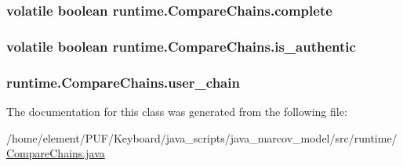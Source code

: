 \subsubsection[{\texorpdfstring{complete}{complete}}]{\setlength{\rightskip}{0pt plus 5cm}volatile boolean runtime.\+Compare\+Chains.\+complete\hspace{0.3cm}{\ttfamily [protected]}}\hypertarget{classruntime_1_1_compare_chains_a506b689f300e16b70789ea87eef80387}{}\label{classruntime_1_1_compare_chains_a506b689f300e16b70789ea87eef80387}
\subsubsection[{\texorpdfstring{is\+\_\+authentic}{is_authentic}}]{\setlength{\rightskip}{0pt plus 5cm}volatile boolean runtime.\+Compare\+Chains.\+is\+\_\+authentic\hspace{0.3cm}{\ttfamily [protected]}}\hypertarget{classruntime_1_1_compare_chains_a55fec8bf930fcd0c7ab835f14b85ac6d}{}\label{classruntime_1_1_compare_chains_a55fec8bf930fcd0c7ab835f14b85ac6d}
\subsubsection[{\texorpdfstring{user\+\_\+chain}{user_chain}}]{ runtime.\+Compare\+Chains.\+user\+\_\+chain\hspace{0.3cm}{\ttfamily [protected]}}\hypertarget{classruntime_1_1_compare_chains_ab222c09ed48638554987292979ede005}{}\label{classruntime_1_1_compare_chains_ab222c09ed48638554987292979ede005}


The documentation for this class was generated from the following file\+:\begin{DoxyCompactItemize}
\item 
/home/element/\+P\+U\+F/\+Keyboard/java\+\_\+scripts/java\+\_\+marcov\+\_\+model/src/runtime/\hyperlink{_compare_chains_8java}{Compare\+Chains.\+java}\end{DoxyCompactItemize}
